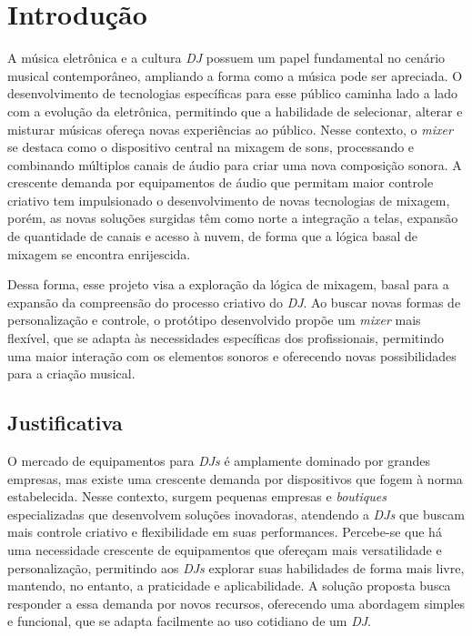 \chapter[Introdução]{Introdução}

A música eletrônica e a cultura \textit{DJ} possuem um papel fundamental no cenário musical contemporâneo, ampliando a forma como a música pode ser apreciada. O desenvolvimento de tecnologias específicas para esse público caminha lado a lado com a evolução da eletrônica, permitindo que a habilidade de selecionar, alterar e misturar músicas ofereça novas experiências ao público. Nesse contexto, o \textit{mixer} se destaca como o dispositivo central na mixagem de sons, processando e combinando múltiplos canais de áudio para criar uma nova composição sonora. A crescente demanda por equipamentos de áudio que permitam maior controle criativo tem impulsionado o desenvolvimento de novas tecnologias de mixagem, porém, as novas soluções surgidas têm como norte a integração a telas, expansão de quantidade de canais e acesso à nuvem, de forma que a lógica basal de mixagem se encontra enrijescida.

Dessa forma, esse projeto visa a exploração da lógica de mixagem, basal para a expansão da compreensão do processo criativo do \textit{DJ}. Ao buscar novas formas de personalização e controle, o protótipo desenvolvido propõe um \textit{mixer} mais flexível, que se adapta às necessidades específicas dos profissionais, permitindo uma maior interação com os elementos sonoros e oferecendo novas possibilidades para a criação musical.

\section{Justificativa}
O mercado de equipamentos para \textit{DJs} é amplamente dominado por grandes empresas, mas existe uma crescente demanda por dispositivos que fogem à norma estabelecida. Nesse contexto, surgem pequenas empresas e \textit{boutiques} especializadas que desenvolvem soluções inovadoras, atendendo a \textit{DJs} que buscam mais controle criativo e flexibilidade em suas performances. Percebe-se que há uma necessidade crescente de equipamentos que ofereçam mais versatilidade e personalização, permitindo aos \textit{DJs} explorar suas habilidades de forma mais livre, mantendo, no entanto, a praticidade e aplicabilidade. A solução proposta busca responder a essa demanda por novos recursos, oferecendo uma abordagem simples e funcional, que se adapta facilmente ao uso cotidiano de um \textit{DJ}.

